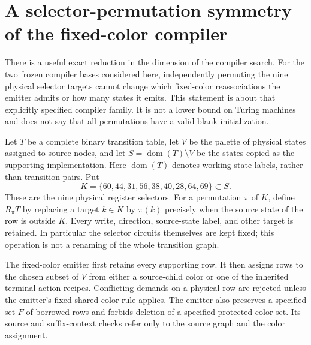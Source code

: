 \section{A selector-permutation symmetry of the fixed-color compiler}
\label{sec:selector-symmetry}

There is a useful exact reduction in the dimension of the compiler search.
For the two frozen compiler bases considered here, independently permuting
the nine physical selector targets cannot change which fixed-color
reassociations the emitter admits or how many states it emits. This statement
is about that explicitly specified compiler family. It is not a lower bound
on Turing machines and does not say that all permutations have a valid blank
initialization.

Let $T$ be a complete binary transition table, let $V$ be the palette of
physical states assigned to source nodes, and let $S=\operatorname{dom}(T)
\setminus V$ be the states copied as the supporting implementation. Here
$\operatorname{dom}(T)$ denotes working-state labels, rather than transition
pairs. Put
\[
 K=\{60,44,31,56,38,40,28,64,69\}\subset S.
\]
These are the nine physical register selectors. For a permutation $\pi$ of
$K$, define $R_\pi T$ by replacing a target $k\in K$ by $\pi(k)$ precisely
when the source state of the row is outside $K$. Every write, direction,
source-state label, and other target is retained. In particular the selector
circuits themselves are kept fixed; this operation is not a renaming of the
whole transition graph.

The fixed-color emitter first retains every supporting row. It then assigns
rows to the chosen subset of $V$ from either a source-child color or one of
the inherited terminal-action recipes. Conflicting demands on a physical
row are rejected unless the emitter's fixed shared-color rule applies.
The emitter also preserves a specified set $F$ of borrowed rows and forbids
deletion of a specified protected-color set. Its source and suffix-context
checks refer only to the source graph and the color assignment.

